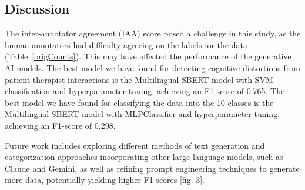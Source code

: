\documentclass[a0,landscape]{a0poster}
\begin{document}
\begin{multicols}{4}
\color{Teal}
\section*{Discussion}
\color{Black}
The inter-annotator agreement (IAA) score posed a challenge in this study, as the human annotators had difficulty agreeing on the labels for the data (Table~\ref*{origCounts}). This may have affected the performance of the generative AI models. The best model we have found for detecting cognitive distortions from patient-therapist interactions is the Multilingual SBERT model with SVM classification and hyperparameter tuning, achieving an F1-score of 0.765. The best model we have found for classifying the data into the 10 classes is the Multilingual SBERT model with MLPClassifier and hyperparameter tuning, achieving an F1-score of 0.298.
\vspace{0.5cm}

Future work includes exploring different methods of text generation and categorization approaches incorporating other large language models, such as Claude and Gemini, as well as refining prompt engineering techniques to generate more data, potentially yielding higher F1-scores [fig. 3].


\end{multicols}
\end{document}
